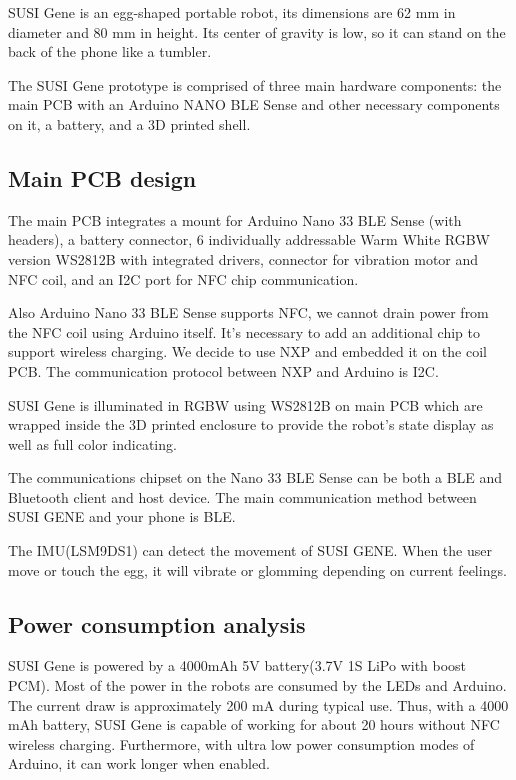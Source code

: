 \documentclass[manuscript,screen]{acmart}
\begin{document}
SUSI Gene is an egg-shaped portable robot, its dimensions are 62 mm in diameter and 80 mm in height. Its center of gravity is low, so it can stand on the back of the phone like a tumbler.

The SUSI Gene prototype is comprised of three main hardware components: the main PCB with an Arduino NANO BLE Sense and other necessary components on it, a battery, and a 3D printed shell.

\subsection{Main PCB design}

The main PCB integrates a mount for Arduino Nano 33 BLE Sense (with headers), a battery connector, 6 individually addressable Warm White RGBW version WS2812B with integrated drivers, connector for vibration motor and NFC coil, and an I2C port for NFC chip communication.

Also Arduino Nano 33 BLE Sense supports NFC, we cannot drain power from the NFC coil using Arduino itself. It's necessary to add an additional chip to support wireless charging. We decide to use NXP and embedded it on the coil PCB. The communication protocol between NXP and Arduino is I2C.

SUSI Gene is illuminated in RGBW using WS2812B on main PCB which are wrapped inside the 3D printed enclosure to provide the robot’s state display as well as full color indicating.

The communications chipset on the Nano 33 BLE Sense can be both a BLE and Bluetooth client and host device. The main communication method between SUSI GENE and your phone is BLE.

The IMU(LSM9DS1) can detect the movement of SUSI GENE. When the user move or touch the egg, it will vibrate or glomming depending on current feelings.

\subsection{Power consumption analysis}

SUSI Gene is powered by a 4000mAh 5V battery(3.7V 1S LiPo with boost PCM). Most of the power in the robots are consumed by the LEDs and Arduino. The current draw is approximately 200 mA during typical use. Thus, with a 4000 mAh battery, SUSI Gene is capable of working for about 20 hours without NFC wireless charging. Furthermore, with ultra low power consumption modes of Arduino, it can work longer when enabled.
\end{document}
